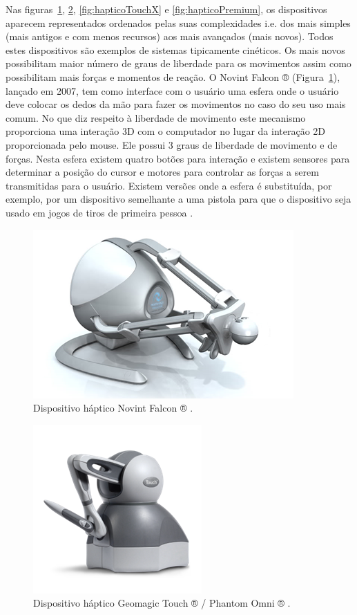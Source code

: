 Nas figuras~\ref{fig:hapticoNovintFalcon}, \ref{fig:hapticoTouch}, \ref{fig:hapticoTouchX} e  \ref{fig:hapticoPremium}, os dispositivos aparecem representados ordenados pelas suas complexidades i.e. dos mais simples (mais antigos e com menos recursos) aos mais avançados (mais novos). Todos estes dispositivos são exemplos de sistemas tipicamente cinéticos. Os mais novos possibilitam maior número de graus de liberdade para os movimentos assim como possibilitam mais forças e momentos de reação. O Novint Falcon ® (Figura~\ref{fig:hapticoNovintFalcon}), lançado em 2007, tem como interface com o usuário uma esfera onde o usuário deve colocar os dedos da mão para fazer os movimentos no caso do seu uso mais comum. No que diz respeito à liberdade de movimento este mecanismo proporciona uma interação 3D com o computador no lugar da interação 2D proporcionada pelo mouse. Ele possui 3 graus de liberdade de movimento e de forças. Nesta esfera existem quatro botões para interação e existem sensores para determinar a posição do cursor e motores para controlar as forças a serem transmitidas para o usuário. Existem versões onde a esfera é substituída, por exemplo, por um dispositivo semelhante a uma pistola para que o dispositivo seja usado em jogos de tiros de primeira pessoa \cite{VRS2017}. 

\begin{figure}[ht!]
    \centering
    \includegraphics[width=0.4\linewidth]{capitulos/figuras/hapticoNovintFalcon.png}
    \caption{Dispositivo háptico Novint Falcon ® \cite{HAPTICSHOUSE2019}
    \label{fig:hapticoNovintFalcon}.}
\end{figure}

\begin{figure}[ht!]
    \centering
    \includegraphics[width=0.4\linewidth]{capitulos/figuras/hapticoTouch.png}
    \caption{Dispositivo háptico Geomagic Touch ® / Phantom Omni ® \cite{3DSystems2018}.}
    \label{fig:hapticoTouch}
\end{figure}

